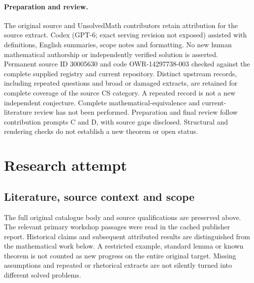 \documentclass[11pt]{article}
\begin{document}
\paragraph{Preparation and review.}
The original source and UnsolvedMath contributors retain attribution for the source extract. Codex (GPT-6; exact serving revision not exposed) assisted with definitions, English summaries, scope notes and formatting. No new human mathematical authorship or independently verified solution is asserted. Permanent source ID 30005630 and code OWR-14297738-003 checked against the complete supplied registry and current repository. Distinct upstream records, including repeated questions and broad or damaged extracts, are retained for complete coverage of the source CS category. A repeated record is not a new independent conjecture. Complete mathematical-equivalence and current-literature review has not been performed. Preparation and final review follow contribution prompts C and D, with source gaps disclosed. Structural and rendering checks do not establish a new theorem or open status.
\label{end:30005630}

\section{Research attempt}
\subsection{Literature, source context and scope}
The full original catalogue body and source qualifications are preserved above. The relevant primary workshop passages were read in the cached publisher report. Historical claims and subsequent attributed results are distinguished from the mathematical work below. A restricted example, standard lemma or known theorem is not counted as new progress on the entire original target. Missing assumptions and repeated or rhetorical extracts are not silently turned into different solved problems.
\end{document}
